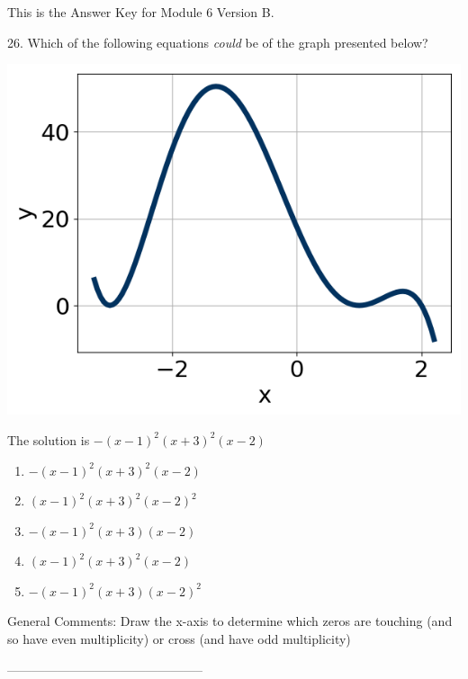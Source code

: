 \documentclass{article}[10pt]
\begin{document}
This is the Answer Key for Module 6 Version B.

26. Which of the following equations \textit{could} be of the graph presented below?
$$  $$ 
\begin{center}\includegraphics[scale=0.5]{../Figures/question26B.png}\end{center}The solution is $ -(x - 1)^2(x + 3)^2(x - 2) $ 

\begin{enumerate}[label=\Alph*.] 
\item $ -(x - 1)^2(x + 3)^2(x - 2) $ 

  
\item $ (x - 1)^2(x + 3)^2(x - 2)^2 $ 

  
\item $ -(x - 1)^2(x + 3)(x - 2) $ 

  
\item $ (x - 1)^2(x + 3)^2(x - 2) $ 

  
\item $ -(x - 1)^2(x + 3)(x - 2)^2 $ 

  
\end{enumerate} 
 
General Comments: Draw the x-axis to determine which zeros are touching (and so have even multiplicity) or cross (and have odd multiplicity)

-----------------------------------------------
\end{document}

